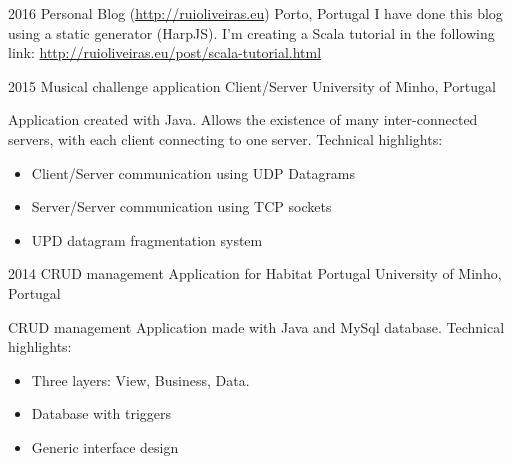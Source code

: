 \documentclass[]{friggeri-cv} %
\begin{document}
\begin{entrylist}
\entry
{2016}
{Personal Blog {\normalfont \normalsize (\href{http://ruioliveiras.eu}{http://ruioliveiras.eu})}}
{Porto, Portugal}
{
  I have done this blog using a static generator (HarpJS).
  I'm creating a Scala tutorial in the following link: \href{http://ruioliveiras.eu/post/scala-tutorial.html}{http://ruioliveiras.eu/post/scala-tutorial.html}
}

\entry
{2015}
{Musical challenge application Client/Server}
{University of Minho, Portugal}
{
    Application created with Java. Allows the existence of many inter-connected servers, with each client connecting to one server. Technical highlights:
\begin{itemize}
    \item Client/Server communication using UDP Datagrams
    \item Server/Server communication using TCP sockets
    \item UPD datagram fragmentation system
\end{itemize}
}



\entry
{2014}
{CRUD management Application for Habitat Portugal}
{University of Minho, Portugal}
{CRUD management Application made with Java and MySql database. Technical highlights:
\begin{itemize}
    \item Three layers: View, Business, Data.
    \item Database with triggers
    \item Generic interface design
\end{itemize}
}


\end{entrylist}
\end{document}
